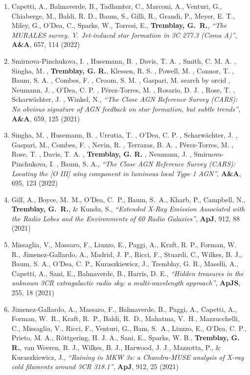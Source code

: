 \documentclass[11pt]{article}
\begin{document}
\begin{enumerate}[resume]
\item Capetti, A., Balmaverde, B., Tadhunter, C., Marconi, A., Venturi, G., Chiaberge, M., Baldi, R. D., Baum, S., Gilli, R., Grandi, P., Meyer, E. T., Miley, G., O'Dea, C., Sparks, W., Torresi, E., \textbf{Tremblay, G.~R.}, \textit{``The MURALES survey. V. Jet-induced star formation in 3C 277.3 (Coma A)''}, \textbf{A\&A}, 657, 114 (2022)

\item Smirnova-Pinchukova, I. , Husemann, B. , Davis, T. A. , Smith, C. M. A. , Singha, M. , \textbf{Tremblay, G. R.}, Klessen, R. S. , Powell, M. , Connor, T. , Baum, S. A. , Combes, F. , Croom, S. M. , Gaspari, M. search by orcid , Neumann, J. , O'Dea, C. P. , Pérez-Torres, M. , Rosario, D. J. , Rose, T. , Scharwächter, J. , Winkel, N., \textit{``The Close AGN Reference Survey (CARS): No obvious signature of AGN feedback on star formation, but subtle trends''}, \textbf{A\&A}, 659, 125 (2021)

\item Singha, M. , Husemann, B. , Urrutia, T. , O'Dea, C. P. , Scharwächter, J. , Gaspari, M., Combes, F. , Nevin, R. , Terrazas, B. A. , Pérez-Torres, M. , Rose, T. , Davis, T. A. , \textbf{Tremblay, G. R.} , Neumann, J. , Smirnova-Pinchukova, I. , Baum, S. A., \textit{``The Close AGN Reference Survey (CARS): Locating the [O III] wing component in luminous local Type 1 AGN''}, \textbf{A\&A}, 695, 123 (2022)

\item Gill, A., Boyce, M.~M., O'Dea, C.~P., Baum, S.~A., Kharb, P., Campbell, N., \textbf{Tremblay, G.~R.},  \& Kundu, S., \textit{``Extended X-Ray Emission Associated with the Radio Lobes and the Environments of 60 Radio Galaxies''}, \textbf{ApJ}, 912, 88 (2021)


\item Missaglia, V., Massaro, F., Liuzzo, E., Paggi, A., Kraft, R. P., Forman, W. R., Jimenez-Gallardo, A., Madrid, J. P., Ricci, F., Stuardi, C., Wilkes, B. J., Baum, S. A., O'Dea, C. P., Kuraszkiewicz, J., Tremblay, G. R., Maselli, A., Capetti, A., Sani, E., Balmaverde, B., Harris, D. E., \textit{``Hidden treasures in the unknown 3CR extragalactic radio sky: a multi-wavelength approach''}, \textbf{ApJS}, 255, 18 (2021)

\item Jimenez-Gallardo, A., Massaro, F., Balmaverde, B., Paggi, A., Capetti, A., Forman, W.~R., Kraft, R.~P., Baldi, R.~D., Mahatma, V.~H., Mazzucchelli, C., Missaglia, V., Ricci, F., Venturi, G., Bam, S.~A., Liuzzo, E., O'Dea, C. P., Prieto, M. A., Röttgering, H. J. A., Sani, E., Sparks, W. B., \textbf{Tremblay, G. R.}, van Weeren, R. J., Wilkes, B. J., Harwood, J. J., Mazzotta, P., \& Kuraszkiewicz, J., \textit{``Raining in MKW 3s: a Chandra-MUSE analysis of X-ray cold filaments around 3CR 318.1''}, \textbf{ApJ}, 912, 25 (2021)


\end{enumerate}
\end{document}
